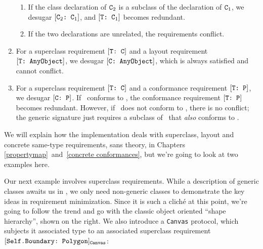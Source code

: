 \documentclass[../generics]{subfiles}
\begin{document}
\begin{definition}
\begin{enumerate}
\begin{enumerate}
\item If the class declaration of $\texttt{C}_2$ is a subclass of the declaration of $\texttt{C}_1$, we desugar $[\texttt{$\texttt{C}_2$:~$\texttt{C}_1$}]$, and $[\texttt{T:~$\texttt{C}_1$}]$ becomes redundant.
\item If the two declarations are unrelated, the requirements conflict.
\end{enumerate}
\item For a superclass requirement $[\texttt{T:~C}]$ and a layout requirement $[\texttt{T:~AnyObject}]$, we desugar $[\texttt{C:~AnyObject}]$, which is always satisfied and cannot conflict.
\item For a superclass requirement $[\texttt{T:~C}]$ and a conformance requirement $[\texttt{T:~P}]$, we desugar $[\texttt{C:~P}]$. If \tC\ conforms to \tP, the conformance requirement $[\texttt{T:~P}]$ becomes redundant. However, if \tC\ does not conform to \tP, there is no conflict; the generic signature just requires a subclass of \tC\ that \emph{also} conforms to \tP.
\end{enumerate}
\end{definition}

We will explain how the implementation deals with superclass, layout and concrete same-type requirements, sans theory, in Chapters \ref{propertymap}~and~\ref{concrete conformances}, but we're going to look at two examples here.

\smallskip

\begin{wrapfigure}[8]{r}{4cm}
\quad{}
\end{wrapfigure}

Our next example involves superclass requirements. While a description of generic classes awaits us in , we only need non-generic classes to demonstrate the key ideas in requirement minimization. Since it is such a clich\'e at this point, we're going to follow the trend and go with the classic object oriented ``shape hierarchy'', shown on the right. We also introduce a \texttt{Canvas} protocol, which subjects it associated type to an associated superclass requirement $[\texttt{Self.Boundary:~Polygon}]_{\texttt{Canvas}}$:
\end{document}
